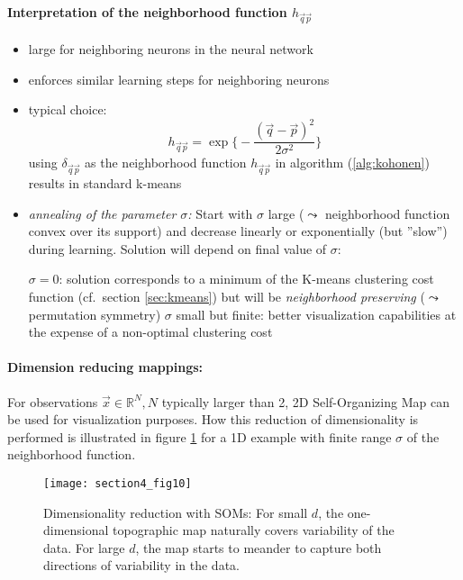 \paragraph{Interpretation of the  neighborhood function $h_{\vec{q} \vec{p}}$}
\label{sec:interpr-neighb-funct}
\begin{itemize}
	\item large for neighboring neurons in the neural network
	\item enforces similar learning steps for neighboring neurons
	\item typical choice:
	\begin{equation} \tag{Gauss function}
		h_{\vec{q} \vec{p}} = \exp \bigg\{ - \frac{ (\vec{q}
			- \vec{p} )^2 }{2 \sigma^2} \bigg\}
	\end{equation}
        \itl using $\delta_{\vec{q} \vec{p}}$ as the neighborhood function $h_{\vec{q} \vec{p}}$ in algorithm (\ref{alg:kohonen}) results in standard k-means
      \item \emph{annealing of the parameter $\sigma$:} Start with
        $\sigma$ large ($\leadsto$ neighborhood function convex over
        its support) and decrease linearly or exponentially (but
        ''slow'') during learning. Solution will depend on 
        final value of $\sigma$:
		\begin{itemize}
                  \itr $\sigma = 0$: solution corresponds to a minimum
                  of the K-means clustering cost function (cf.\
                  section \ref{sec:kmeans}) but will be
                  \emph{neighborhood preserving} ($\leadsto$
                  permutation symmetry) \itr $\sigma$ small but
                  finite: better visualization capabilities at the
                  expense of a non-optimal clustering cost
		\end{itemize}
\end{itemize}

\paragraph{Dimension reducing mappings:}\label{sec:dimens-reduc-mapp}
For observations $\vec{x} \in \mathbb{R}^N, N$ typically larger than 
2, 2D Self-Organizing Map can be used for visualization purposes. How this 
reduction of dimensionality is performed is illustrated in figure \ref{fig:som1}
for a 1D example with finite range $\sigma$ of the neighborhood function. 
\begin{figure}
  \centering
\texttt{[image: section4\_fig10]}  
  \caption{Dimensionality reduction with SOMs: For small $d$, the one-dimensional topographic map naturally covers variability of the data. For large $d$, the map starts to meander to capture both directions of variability in the data.}
  \label{fig:som1}
\end{figure}

